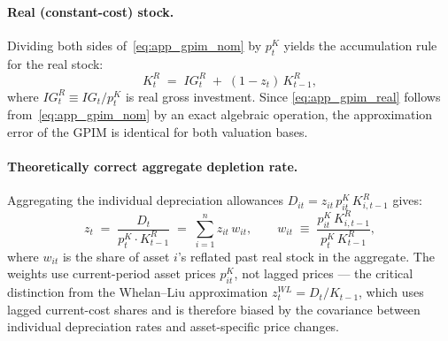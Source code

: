 \paragraph{Real (constant-cost) stock.}
Dividing both sides of~\eqref{eq:app_gpim_nom} by $p_t^{K}$ yields the
accumulation rule for the real stock:
%
\begin{equation}
  \label{eq:app_gpim_real}
  K_t^{R} \;=\; IG_t^{R} \;+\; (1 - z_t)\,K_{t-1}^{R},
\end{equation}
%
where $IG_t^{R} \equiv IG_t/p_t^{K}$ is real gross investment. Since
\eqref{eq:app_gpim_real} follows from~\eqref{eq:app_gpim_nom} by an
exact algebraic operation, the approximation error of the GPIM is
identical for both valuation bases.

\paragraph{Theoretically correct aggregate depletion rate.}
Aggregating the individual depreciation allowances
$D_{it} = z_{it}\,p_{it}^{K}\,K_{i,t-1}^{R}$ gives:
%
\begin{equation}
  \label{eq:app_dep_rate}
  z_t \;=\; \frac{D_t}{p_t^{K}\cdot K_{t-1}^{R}}
  \;=\; \sum_{i=1}^{n} z_{it}\,w_{it},
  \qquad
  w_{it} \;\equiv\;
  \frac{p_{it}^{K}\,K_{i,t-1}^{R}}{p_t^{K}\,K_{t-1}^{R}},
\end{equation}
%
where $w_{it}$ is the share of asset $i$'s reflated past real stock in
the aggregate. The weights use current-period asset prices $p_{it}^{K}$,
not lagged prices --- the critical distinction from the
Whelan--Liu approximation $z_t^{WL} = D_t/K_{t-1}$, which uses lagged
current-cost shares and is therefore biased by the covariance between
individual depreciation rates and asset-specific price changes.

